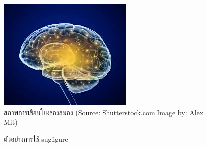 \documentclass[11pt,a4paper]{article}
\begin{document}
\begin{figure}[h!]
	\begin{center}
		\includegraphics[width=0.5\linewidth]{brain.jpg}
		\caption{สภาพการเชื่อมโยงของสมอง (Source: Shutterstock.com Image by: Alex Mit)}
	\end{center}
\end{figure}

\begin{figure}
\centering
{} 
\caption{ตัวอย่างการใช้ sugfigure}

\end{figure}
\end{document}
